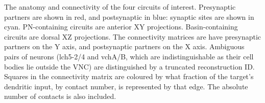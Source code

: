 The anatomy and connectivity of the four circuits of interest.
Presynaptic partners are shown in red, and postsynaptic in blue: synaptic sites are shown in cyan.
PN-containing circuits are anterior XY projections.
Basin-containing circuits are dorsal XZ projections.
The connectivity matrices are have presynaptic partners on the Y axis, and postsynaptic partners on the X axis.
Ambiguous pairs of neurons (lch5-2/4 and vchA/B, which are indistinguishable as their cell bodies lie outside the VNC) are distinguished by a truncated reconstruction ID.
Squares in the connectivity matrix are coloured by what fraction of the target's dendritic input, by contact number, is represented by that edge.
The absolute number of contacts is also included.